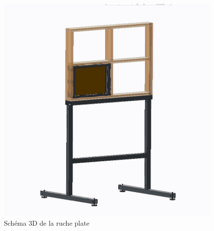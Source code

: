 \documentclass[11pt,french,a4paper]{report}
\begin{document}
\begin{figure}[!h]
\includegraphics[scale=0.3]{../images/schema_ruche/supportrucheplate.JPG} 
\caption{Schéma 3D de la ruche plate}
\label{rpz_ruche}
\end{figure}
\end{document}

